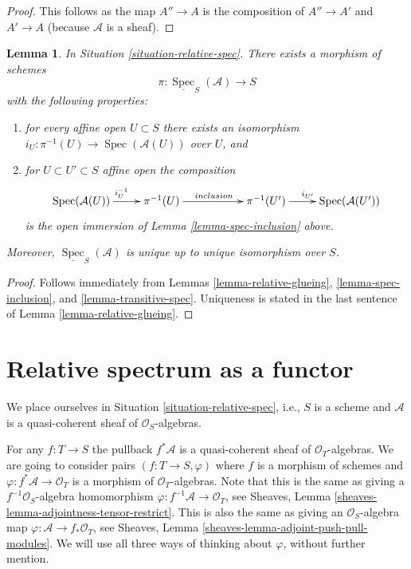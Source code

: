 \documentclass{stacks-project}
\theoremstyle{plain}
\newtheorem{lemma}[subsection]{Lemma}
\theoremstyle{definition}
\theoremstyle{remark}
\numberwithin{equation}{subsection}
\def\Spec{\mathop{\mathrm{Spec}}}
\begin{document}
\begin{proof}
This follows as the map $A'' \to A$ is the composition of $A'' \to A'$ and
$A' \to A$ (because $\mathcal{A}$ is a sheaf).
\end{proof}

\begin{lemma}
\label{lemma-glue-relative-spec}
In Situation \ref{situation-relative-spec}.
There exists a morphism of schemes
$$
\pi : \underline{\Spec}_S(\mathcal{A}) \longrightarrow S
$$
with the following properties:
\begin{enumerate}
\item for every affine open $U \subset S$ there exists an isomorphism
$i_U : \pi^{-1}(U) \to \Spec(\mathcal{A}(U))$ over $U$, and
\item for $U \subset U' \subset S$ affine open the composition
$$
\xymatrix{
\Spec(\mathcal{A}(U)) \ar[r]^{i_U^{-1}} &
\pi^{-1}(U) \ar[rr]^{inclusion} & &
\pi^{-1}(U') \ar[r]^{i_{U'}} &
\Spec(\mathcal{A}(U'))
}
$$
is the open immersion of Lemma \ref{lemma-spec-inclusion} above.
\end{enumerate}
Moreover, $\underline{\Spec}_S(\mathcal{A})$
is unique up to unique isomorphism over $S$.
\end{lemma}

\begin{proof}
Follows immediately from
Lemmas \ref{lemma-relative-glueing},
\ref{lemma-spec-inclusion}, and
\ref{lemma-transitive-spec}.
Uniqueness is stated in the last sentence of
Lemma \ref{lemma-relative-glueing}.
\end{proof}












\section{Relative spectrum as a functor}
\label{section-spec}

\noindent
We place ourselves in Situation \ref{situation-relative-spec}, i.e.,
$S$ is a scheme and $\mathcal{A}$ is a quasi-coherent sheaf of
$\mathcal{O}_S$-algebras.

\medskip\noindent
For any $f : T \to S$ the pullback
$f^*\mathcal{A}$ is a quasi-coherent sheaf of $\mathcal{O}_T$-algebras.
We are going to consider pairs $(f : T \to S, \varphi)$ where
$f$ is a morphism of schemes and $\varphi : f^*\mathcal{A} \to \mathcal{O}_T$
is a morphism of $\mathcal{O}_T$-algebras. Note that this is the
same as giving a $f^{-1}\mathcal{O}_S$-algebra homomorphism
$\varphi : f^{-1}\mathcal{A} \to \mathcal{O}_T$, see
Sheaves, Lemma \ref{sheaves-lemma-adjointness-tensor-restrict}.
This is also the same as giving an $\mathcal{O}_S$-algebra map
$\varphi : \mathcal{A} \to f_*\mathcal{O}_T$, see
Sheaves, Lemma \ref{sheaves-lemma-adjoint-push-pull-modules}.
We will use all three ways of thinking about $\varphi$,
without further mention.
\end{document}
